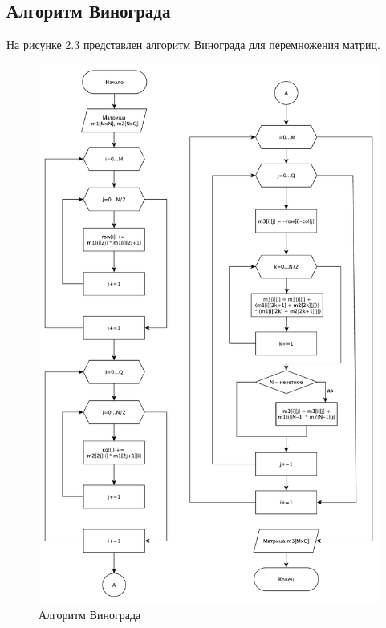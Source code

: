 \subsection{Алгоритм Винограда}
На рисунке 2.3 представлен алгоритм Винограда для перемножения матриц.
\begin{figure}
\centering
\includegraphics[scale=0.41]{shema2.pdf}
\caption{Алгоритм Винограда}
\end{figure}

